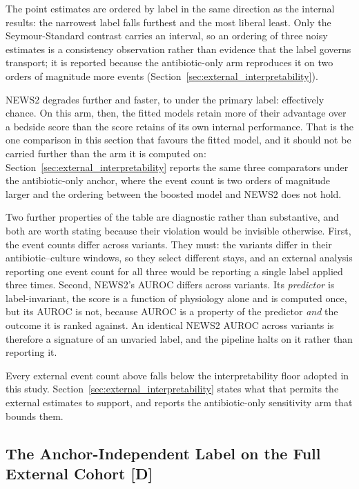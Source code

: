 The point estimates are ordered by label in the same direction as the internal
results: the narrowest label falls furthest and the most liberal least. Only
the Seymour-Standard contrast carries an interval, so an ordering of three
noisy estimates is a consistency observation rather than evidence that the
label governs transport; it is reported because the antibiotic-only arm
reproduces it on two orders of magnitude more events
(Section~\ref{sec:external_interpretability}).

NEWS2 degrades further and faster, to \pcExtAurocNewsB{} under the primary
label: effectively chance. On this arm, then, the fitted models retain more of
their advantage over a bedside score than the score retains of its own internal
performance. That is the one comparison in this section that favours the fitted
model, and it should not be carried further than the arm it is computed on:
Section~\ref{sec:external_interpretability} reports the same three comparators
under the antibiotic-only anchor, where the event count is two orders of
magnitude larger and the ordering between the boosted model and NEWS2 does not
hold.

Two further properties of the table are diagnostic rather than substantive, and
both are worth stating because their violation would be invisible otherwise.
First, the event counts differ across variants. They must: the variants differ
in their antibiotic--culture windows, so they select different stays, and an
external analysis reporting one event count for all three would be reporting a
single label applied three times. Second, NEWS2's AUROC differs across
variants. Its \emph{predictor} is label-invariant, the score is a function of
physiology alone and is computed once, but its AUROC is not, because AUROC is
a property of the predictor \emph{and} the outcome it is ranked against. An
identical NEWS2 AUROC across variants is therefore a signature of an unvaried
label, and the pipeline halts on it rather than reporting it.

Every external event count above falls below the interpretability floor adopted
in this study. Section~\ref{sec:external_interpretability} states what that
permits the external estimates to support, and reports the antibiotic-only
sensitivity arm that bounds them.

\subsection{The Anchor-Independent Label on the Full External Cohort
\texorpdfstring{[D]}{[D]}}
\label{sec:external_altlabel}

